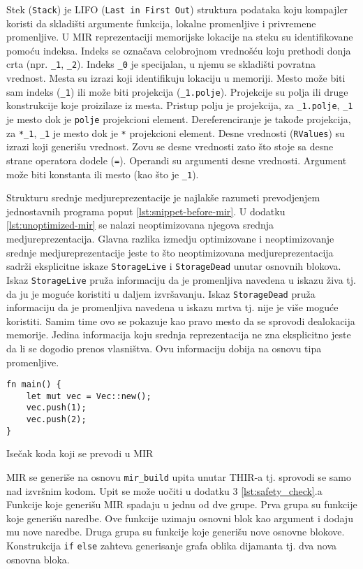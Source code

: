 Stek (\verb|Stack|) je LIFO (\verb|Last in First Out|) struktura podataka koju kompajler koristi da skladišti argumente funkcija,
lokalne promenljive i privremene promenljive. U MIR reprezentaciji memorijske lokacije na steku su identifikovane pomoću indeksa. 
Indeks se označava celobrojnom vrednošću koju prethodi donja crta (npr. \verb|_1|, \verb|_2|). Indeks \verb|_0| je specijalan, u njemu
se skladišti povratna vrednost. Mesta su izrazi koji identifikuju lokaciju u memoriji. Mesto može biti sam indeks (\verb|_1|) ili može biti
projekcija (\verb|_1.polje|). Projekcije su polja ili druge konstrukcije koje proizilaze iz mesta. Pristup polju je projekcija, za \verb|_1.polje|, \verb|_1| je mesto dok je \verb|polje| projekcioni element.
Dereferenciranje je takođe projekcija, za \verb|*_1|, \verb|_1| je mesto dok je \verb|*| projekcioni element. 
Desne vrednosti (\verb|RValues|) su izrazi koji generišu vrednost. Zovu se desne vrednosti zato što 
stoje sa desne strane operatora dodele (\verb|=|). Operandi su argumenti desne vrednosti. Argument može biti konstanta ili mesto (kao što je \verb|_1|).

Strukturu srednje medjureprezentacije je najlakše razumeti prevodjenjem jednostavnih programa poput \ref{lst:snippet-before-mir}. U dodatku \ref{lst:unoptimized-mir} se nalazi neoptimizovana njegova srednja medjureprezentacija. Glavna razlika izmedju optimizovane i neoptimizovanje srednje medjureprezentacije jeste to što neoptimizovana medjureprezentacija sadrži eksplicitne iskaze \verb|StorageLive| i \verb|StorageDead| unutar osnovnih blokova. Iskaz \verb|StorageLive| pruža informaciju da je promenljiva navedena u iskazu živa tj.
da ju je moguće koristiti u daljem izvršavanju. Iskaz \verb|StorageDead| pruža informaciju da je promenljiva navedena u iskazu mrtva
tj. nije je više moguće koristiti. Samim time ovo se pokazuje kao pravo mesto da se sprovodi dealokacija memorije.
Jedina informacija koju srednja reprezentacija ne zna eksplicitno jeste da li se dogodio prenos vlasništva. Ovu informaciju dobija na osnovu tipa promenljive.

\begin{listing}[H]
\begin{verbatim}
fn main() {
    let mut vec = Vec::new();
    vec.push(1);
    vec.push(2);
}
\end{verbatim}
\caption{Isečak koda koji se prevodi u MIR}
\label{lst:snippet-before-mir}
\end{listing}

MIR se generiše na osnovu \verb|mir_build| upita unutar THIR-a tj. sprovodi se samo nad izvršnim kodom. Upit se može uočiti u dodatku 3 \ref{lst:safety_check}.a Funkcije koje generišu MIR spadaju u jednu od dve grupe. Prva grupa su funkcije koje generišu naredbe.
Ove funkcije uzimaju osnovni blok kao argument i dodaju mu nove naredbe. Druga grupa su funkcije koje generišu nove osnovne 
blokove. Konstrukcija \verb|if| \verb|else| zahteva generisanje grafa oblika dijamanta tj. dva nova osnovna bloka.


